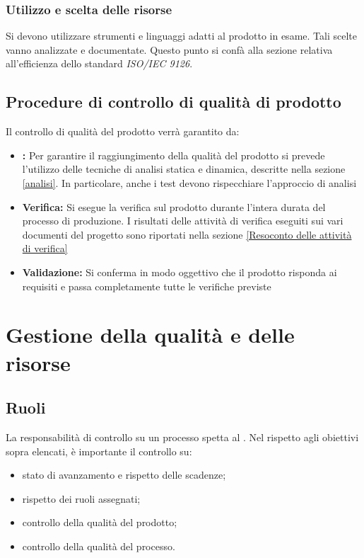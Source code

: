 \documentclass[12pt,a4paper]{article}
\begin{document}
\subsubsection{Utilizzo e scelta delle risorse}
Si devono utilizzare strumenti e linguaggi adatti al prodotto in esame. Tali scelte vanno analizzate e documentate. Questo punto si confà alla sezione relativa all'efficienza dello standard \textit{ISO/IEC 9126}.


\subsection{Procedure di controllo di qualità di prodotto}\label{sec:procedure-di-controllo-di-qualità-di-prodotto}
Il controllo di qualità del prodotto verrà garantito da:
\begin{itemize}
	\item \textbf{:} Per garantire il raggiungimento della qualità del prodotto si prevede l'utilizzo delle tecniche di analisi statica e dinamica, descritte nella sezione \ref{analisi}. In particolare, anche i test devono rispecchiare l'approccio  di analisi
	\item \textbf{Verifica:} Si esegue la verifica sul prodotto durante l'intera durata del processo di produzione. I risultati delle attività di verifica eseguiti sui vari documenti del progetto sono riportati nella sezione \ref{Resoconto delle attività di verifica}
	\item \textbf{Validazione:} Si conferma in modo oggettivo che il prodotto risponda ai requisiti e passa completamente tutte le verifiche previste
\end{itemize}

\newpage

\section{Gestione della qualità e delle risorse}
\subsection{Ruoli}
La responsabilità di controllo su un processo spetta al \PM{}. Nel rispetto agli obiettivi sopra elencati, è importante il controllo su:
\begin{itemize}
	\item stato di avanzamento e rispetto delle scadenze;
	\item rispetto dei ruoli assegnati;
	\item controllo della qualità del prodotto;
	\item controllo della qualità del processo. 
\end{itemize}
\end{document}
